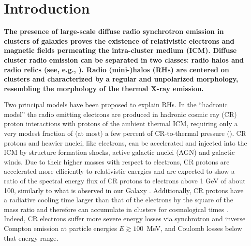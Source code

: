 \documentclass[useAMS,usenatbib]{mn2e}
\begin{document}
\section{Introduction}
\label{sec:1}

{\bf The presence of large-scale diffuse radio synchrotron emission in clusters of
galaxies proves the existence of relativistic electrons and magnetic fields
permeating the intra-cluster medium (ICM). Diffuse cluster radio emission can be
separated in two classes: radio halos and radio relics (see, e.g., 
\citealp{2012A&ARv..20...54F}).  Radio \mbox{(mini-)}halos (RHs) are centered 
on clusters and characterized by a regular and unpolarized morphology, resembling 
the morphology of the thermal X-ray emission.}
                                   
Two principal models have been proposed to explain RHs.  In the ``hadronic
model'' the radio emitting electrons are produced in hadronic cosmic ray (CR)
proton interactions with protons of the ambient thermal ICM, requiring only a
very modest fraction of (at most) a few percent of CR-to-thermal pressure
(\citealp{1980ApJ...239L..93D,1982AJ.....87.1266V, 1999APh....12..169B,
  2000A&A...362..151D, 2001ApJ...562..233M,2001ApJ...559...59M,
  2003MNRAS.342.1009M,2003A&A...407L..73P, 2004A&A...413...17P,
  2004MNRAS.352...76P, 2007IJMPA..22..681B, 2008MNRAS.385.1211P,
  2008MNRAS.385.1242P, 2009JCAP...09..024K, 2010MNRAS.401...47D,
  2010arXiv1003.0336D, 2010arXiv1003.1133K, 2010arXiv1011.0729K,
  2011A&A...527A..99E}).  CR protons and heavier nuclei, like electrons, can be
accelerated and injected into the ICM by structure formation shocks, active
galactic nuclei (AGN) and galactic winds.  Due to their higher masses with
respect to electrons, CR protons are accelerated more efficiently to
relativistic energies and are expected to show a ratio of the spectral energy
flux of CR protons to electrons above 1 GeV of about 100, similarly to what is
observed in our Galaxy \citep{2002cra..book.....S}. Additionally, CR protons
have a radiative cooling time larger than that of the electrons by the square of
the mass ratio and therefore can accumulate in clusters for cosmological times
\citep{1996SSRv...75..279V}. Indeed, CR electrons suffer more severe energy
losses via synchrotron and inverse Compton emission at particle energies $E
\gtrsim 100$~MeV, and Coulomb losses below that energy range.
\end{document}
